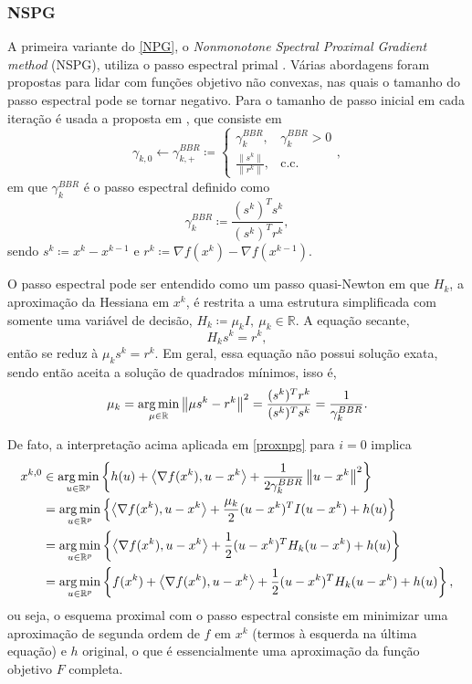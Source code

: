 \subsubsection{NSPG}
A primeira variante do \autoref{NPG}, o \textit{Nonmonotone Spectral Proximal Gradient method} (NSPG), utiliza o passo espectral primal \cite{BB1,BB2}. Várias abordagens foram propostas para lidar com funções objetivo não convexas, nas quais o tamanho do passo espectral pode se tornar negativo. Para o tamanho de passo inicial em cada iteração é usada a proposta em \cite{positiveBB}, que consiste em 
\begin{equation}
    \label{BBR}
\gamma_{k,0}\gets\gamma_{k,+}^{BBR}\coloneq\begin{cases}
     \gamma_k^{BBR},& \gamma_k^{BBR}> 0\\
     \frac{\|s^k\|}{\|r^k\|},& \text{c.c.}
\end{cases}, 
\end{equation}
em que $\gamma_k^{BBR}$ é o passo espectral definido como
\[
\gamma_k^{BBR}\coloneqq\frac{(s^k)^Ts^k}{(s^k)^Tr^k},
\]
sendo $s^k\coloneqq x^k-x^{k-1}$ e $r^k\coloneqq\nabla f(x^k)-\nabla f(x^{k-1})$.

O passo espectral pode ser entendido como um passo quasi-Newton em que $H_k$, a aproximação da Hessiana em $x^k$, é restrita a uma estrutura simplificada com somente uma variável de decisão, $H_k\coloneqq\mu_k I,\ \mu_k \in \mathbb{R}$. A equação secante, 
\begin{equation}
    H_ks^k=r^k, \label{eq:sec}
\end{equation}
então se reduz à $\mu_k s^k=r^k$. Em geral, essa equação não possui solução exata, sendo então aceita a solução de quadrados mínimos, isso é,
\[
\mu_k=\operatorname*{arg\,min}_{\mu\in\mathbb{R}}\left\|\mu s^k-r^k\right\|^2=\frac{(s^k)^Tr^k}{(s^k)^Ts^k}=\frac{1}{\gamma_k^{BBR}}.
\]

De fato, a interpretação acima aplicada em \eqref{proxnpg} para $i=0$ implica
\begin{align*}
    x^{k,0}&\in\operatorname*{arg\,min}_{u\in\mathbb{R}^p}\left\{ h(u)+\left\langle \nabla f(x^k), u-x^k \right\rangle+\frac{1}{2\gamma_k^{BBR}}\left\| u-x^k \right\|^2 \right\}\\
    &=\operatorname*{arg\,min}_{u\in\mathbb{R}^p}\left\{ \left\langle \nabla f(x^k), u-x^k \right\rangle+\frac{\mu_k}{2}(u-x^k)^TI(u-x^k)+h(u) \right\}\\
    &=\operatorname*{arg\,min}_{u\in\mathbb{R}^p}\left\{ \left\langle \nabla f(x^k), u-x^k \right\rangle+\frac{1}{2}(u-x^k)^TH_k(u-x^k)+h(u) \right\}
    \\
    &=\operatorname*{arg\,min}_{u\in\mathbb{R}^p}\left\{f(x^k)+ \left\langle \nabla f(x^k), u-x^k \right\rangle+\frac{1}{2}(u-x^k)^TH_k(u-x^k)+h(u) \right\},
\end{align*}
ou seja, o esquema proximal com o passo espectral consiste em minimizar uma aproximação de segunda ordem de $f$ em $x^k$ (termos à esquerda na última equação) e $h$ original, o que é essencialmente uma aproximação da função objetivo $F$ completa.

